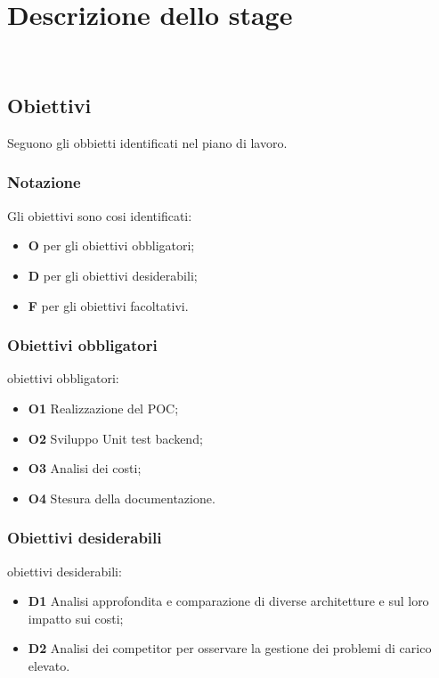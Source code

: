 \chapter{Descrizione dello stage}
\\
\label{cap:descrizione-stage}
\section{Obiettivi}
\label{sec:obiettivi}
Seguono gli obbietti identificati nel piano di lavoro.
\subsection{Notazione}
\label{subsec:notazione}
Gli obiettivi sono cosi identificati:
\begin{itemize}
    \item \textbf{O} per gli obiettivi obbligatori;
    \item \textbf{D} per gli obiettivi desiderabili;
    \item \textbf{F} per gli obiettivi facoltativi.
\end{itemize}
\subsection{Obiettivi obbligatori}
obiettivi obbligatori:
\begin{itemize}
    \item \textbf{O1} Realizzazione del POC;
    \item \textbf{O2} Sviluppo Unit test backend;
    \item \textbf{O3} Analisi dei costi;
    \item \textbf{O4} Stesura della documentazione.
\end{itemize}
\subsection{Obiettivi desiderabili}
obiettivi desiderabili:
\begin{itemize}
    \item \textbf{D1} Analisi approfondita e comparazione di diverse architetture e sul loro impatto sui costi;
    \item \textbf{D2} Analisi dei competitor per osservare la gestione dei problemi di carico elevato.
\end{itemize}
